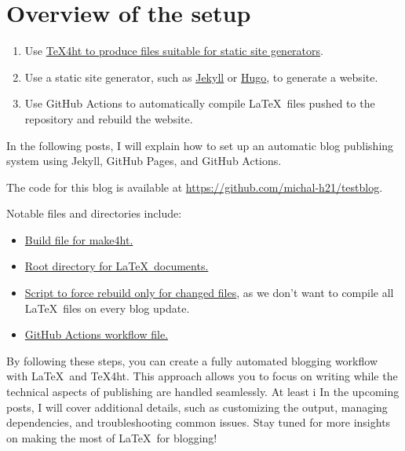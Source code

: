 \documentclass{article}
\begin{document}
\section{Overview of the setup}

\begin{enumerate}
\item Use \href{/testblog/2021/07/30/how-to-blog-with-tex4ht.html}
{\TeX4ht to produce files suitable for static site generators}.
\item Use a static site generator, such as \href{https://jekyllrb.com/}{Jekyll}
or \href{https://gohugo.io/}{Hugo}, to generate a website.
\item Use GitHub Actions to automatically compile \LaTeX\ files pushed
to the repository and rebuild the website.
\end{enumerate}

In the following posts, I will explain how to set up an automatic
blog publishing system using Jekyll, GitHub Pages, and GitHub Actions.

The code for this blog is available at
\url{https://github.com/michal-h21/testblog}.

Notable files and directories include:

\begin{itemize}
  \item \href{https://github.com/michal-h21/testblog/blob/main/.make4ht}{Build file for make4ht.}
  \item \href{https://github.com/michal-h21/testblog/tree/main/texposts}{Root directory for \LaTeX\ documents.}
  \item \href{https://github.com/michal-h21/testblog/blob/main/texposts/rebuild.sh}{Script to force rebuild only for changed files},
    as we don't want to compile all \LaTeX\ files on every blog update.
  \item \href{https://github.com/michal-h21/testblog/blob/main/.github/workflows/main.yml}{GitHub Actions workflow file.}
\end{itemize}

By following these steps, you can create a fully automated blogging workflow with \LaTeX\ and \TeX4ht. 
This approach allows you to focus on writing while the technical aspects of publishing are handled seamlessly. 
At least i
In the upcoming posts, I will cover additional details, such as customizing the output, managing dependencies, 
and troubleshooting common issues. Stay tuned for more insights on making the most of \LaTeX\ for blogging!
\end{document}
